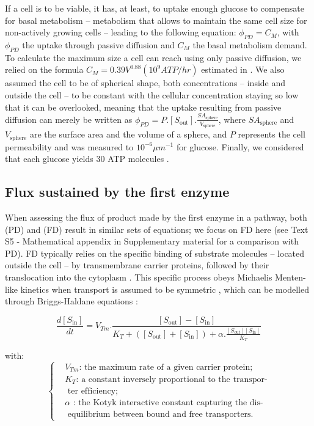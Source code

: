 \documentclass[11pt,onecolumn]{article}
\begin{document}
If a cell is to be viable, it has, at least, to uptake enough glucose to compensate for basal metabolism -- metabolism that allows to maintain the same cell size for non-actively growing cells \citep{Lynch15} -- leading to the following equation: $\phi_{PD}=C_M$, with $\phi_{PD}$ the uptake through passive diffusion and $C_M$ the basal metabolism demand. To calculate the maximum size a cell can reach using only passive diffusion, we relied on the formula $C_M=0.39V^{0.88} (10^9 ATP/hr)$ estimated in \citep{Lynch15}. We also assumed the cell to be of spherical shape, both concentrations -- inside and outside the cell -- to be constant with the cellular concentration staying so low that it can be overlooked, meaning that the uptake resulting from passive diffusion can merely be written as $\phi_{PD}=P.[S_{\text{out}}].\frac{SA_{\text{sphere}}}{V_{\text{sphere}}}$, where $SA_{\text{sphere}}$ and $V_{\text{sphere}}$ are the surface area and the volume of a sphere, and $P$ represents the cell permeability and was measured to $10^{-6}\mu m^{-1}$ \citep{Wood68} for glucose. Finally, we considered that each glucose yields 30 ATP molecules \citep{Rich03}. 

\subsection{Flux sustained by the first enzyme}

When assessing the flux of product made by the first enzyme in a pathway, both (PD) and (FD) result in similar sets of equations; we focus on FD here (see Text S5 - Mathematical appendix in Supplementary material for a comparison with PD). FD typically relies on the specific binding of substrate molecules -- located outside the cell -- by transmembrane carrier proteins, followed by their translocation into the cytoplasm \citep{danielli1954,Wilbrandt61,Kotyk67,Bosdriesz18}. This specific process obeys Michaelis Menten-like kinetics when transport is assumed to be symmetric \citep{Kotyk67}, which can be modelled through Briggs-Haldane equations \citep{Briggs25,Haldane30,Stein86d}:

\small
\begin{equation}
\frac{d[S_\text{in}]}{dt}=V_{Tm}.\frac{[S_\text{out}]-[S_\text{in}]}{K_T+([S_\text{out}]+[S_\text{in}])+\alpha.\frac{[S_\text{out}][S_\text{in}]}{K_T}}
\end{equation}
\normalsize

with:
\small
\begin{equation*}
  \left\{
      \begin{aligned}
		&V_{Tm}\text{: the maximum rate of a given carrier protein;}\\
		&K_T\text{: a constant inversely proportional to the transpor-}\\
		&\text{  ter efficiency};\\
		&\alpha \text{ : the Kotyk interactive constant  capturing the dis-}\\
		&\text{  equilibrium between bound and free transporters.}
      \end{aligned}
    \right.
\end{equation*}
\normalsize
\end{document}
